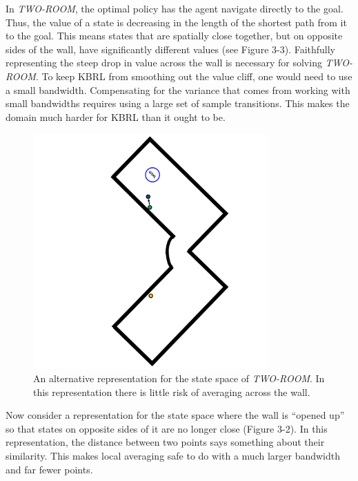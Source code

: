 In \textit{TWO-ROOM}, the optimal policy has the agent navigate 
directly to the goal.
Thus, the value of a state is decreasing in the length of the shortest
path from it to the goal.
This means states that are spatially close together, but on opposite sides
of the wall, have significantly different values (see Figure 3-3).
Faithfully representing the steep drop in value across the wall is
necessary for solving \textit{TWO-ROOM}.
To keep KBRL from smoothing out the value cliff, one would need to use
a small bandwidth.
Compensating for the variance that comes from working with
small bandwidths requires using a large set of sample transitions.
This makes the domain much harder for KBRL than it ought to be.

\begin{figure}[!!!ht]
  \centering
    \includegraphics[width=90mm]{figs/tf2room.pdf}
  \caption[Alternative representation for the state space of
      \textit{TWO-ROOM}]
      {An alternative representation for the state space of
\textit{TWO-ROOM}. In this representation there is little risk of
averaging across the wall.}
  \label{fig:tf2rm}
\end{figure}

Now consider a representation for the state space where the wall is
``opened up'' so that states on opposite sides of it are no longer close
(Figure 3-2).
In this representation, the distance between two points says something
about their similarity.
This makes local averaging safe to do with a much larger bandwidth and
far fewer points.

